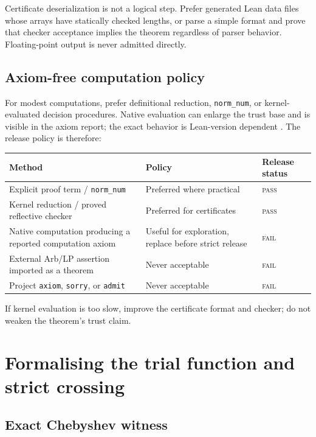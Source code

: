\documentclass[11pt]{article}
\newcommand{\leanname}[1]{\texttt{#1}}
\newcommand{\pass}{\textsc{pass}}
\newcommand{\fail}{\textsc{fail}}
\begin{document}
Certificate deserialization is not a logical step.  Prefer generated Lean data
files whose arrays have statically checked lengths, or parse a simple format
and prove that checker acceptance implies the theorem regardless of parser
behavior.  Floating-point output is never admitted directly.

\subsection{Axiom-free computation policy}

For modest computations, prefer definitional reduction,
\leanname{norm\_num}, or kernel-evaluated decision procedures.  Native
evaluation can enlarge the trust base and is visible in the axiom report; the
exact behavior is Lean-version dependent \cite{LeanValidation}.  The release
policy is therefore:

\begin{center}
\begin{tabularx}{\textwidth}{p{}X p{}}
\toprule
Method & Policy & Release status \\
\midrule
Explicit proof term / \leanname{norm\_num} & Preferred where practical &
\pass \\
Kernel reduction / proved reflective checker & Preferred for certificates &
\pass \\
Native computation producing a reported computation axiom & Useful for
exploration, replace before strict release & \fail \\
External Arb/LP assertion imported as a theorem & Never acceptable & \fail \\
Project \leanname{axiom}, \leanname{sorry}, or \leanname{admit} & Never
acceptable & \fail \\
\bottomrule
\end{tabularx}
\end{center}

If kernel evaluation is too slow, improve the certificate format and checker;
do not weaken the theorem's trust claim.

\section{Formalising the trial function and strict crossing}

\subsection{Exact Chebyshev witness}
\end{document}

